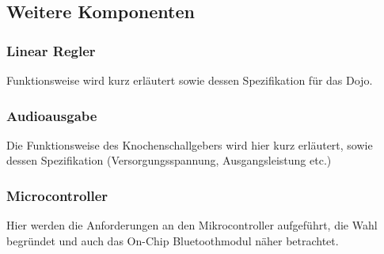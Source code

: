 \subsection{Weitere Komponenten}\label{sec:weitereKomponenten}


\subsubsection{Linear Regler}
Funktionsweise wird kurz erläutert sowie dessen Spezifikation für das Dojo.


\subsubsection{Audioausgabe}
Die Funktionsweise des Knochenschallgebers wird hier kurz erläutert, sowie dessen Spezifikation (Versorgungsspannung, Ausgangsleistung etc.)


\subsubsection{Microcontroller}
Hier werden die Anforderungen an den Mikrocontroller aufgeführt, die Wahl begründet und auch das On-Chip Bluetoothmodul näher betrachtet.
